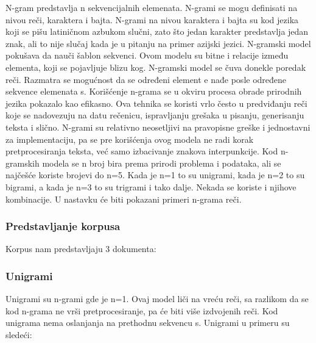 \documentclass[12pt,oneside]{memoir}
\begin{document}
N-gram predstavlja n sekvencijalnih elemenata.  N-grami se mogu definisati na nivou reči, karaktera i bajta.  N-grami na nivou karaktera i bajta su kod jezika koji se pišu latiničnom azbukom slučni,  zato što jedan karakter predstavlja jedan znak, ali to nije slučaj kada je u pitanju na primer azijski jezici.  N-gramski model pokušava da nauči šablon sekvenci.  Ovom modelu su bitne i relacije između elementa, koji se pojavljuje blizu kog.  N-gramski model se čuva donekle poredak reči.  Razmatra se mogućnost da se određeni element e nađe posle određene sekvence elemenata s. 
Korišćenje n-grama se u okviru procesa obrade prirodnih jezika pokazalo kao efikasno.  Ova tehnika se koristi vrlo često u predviđanju reči koje se nadovezuju na datu rečenicu, ispravljanju grešaka u pisanju, generisanju teksta i slično.  
N-grami su relativno neosetljivi na pravopisne greške i jednostavni za implementaciju, pa se pre korišćenja ovog modela ne radi korak pretprocesiranja teksta, već samo izbacivanje znakova interpunkcije.  
Kod n-gramskih modela se n broj bira prema prirodi problema i podataka,  ali se najčešće koriste brojevi do n=5.  Kada je n=1 to su unigrami, kada je n=2 to su bigrami,  a kada je n=3 to su trigrami i tako dalje.  Nekada se koriste i njihove kombinacije. 
U nastavku će biti pokazani primeri n-grama reči.

\subsubsection{Predstavljanje korpusa}
Korpus nam predstavljaju 3 dokumenta:
\newline
\newline
\noindent{}
\newline
\newline

\subsubsection{Unigrami}
Unigrami su n-grami gde je n=1. Ovaj model liči na vreću reči, sa razlikom da se kod n-grama ne vrši pretprocesiranje,  pa će biti više izdvojenih reči.  Kod unigrama nema oslanjanja na prethodnu sekvencu s. 
Unigrami u primeru su sledeći:
\newline
\newline
\noindent{}
\newline
\newline
\end{document}
